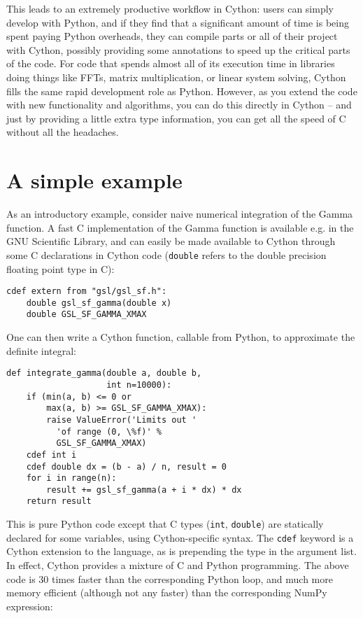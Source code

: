 \documentclass[letterpaper,11pt,english]{article}
\newcommand{\code}[1]{\texttt{#1}}
\begin{document}
This leads to an extremely productive workflow in Cython: users can
simply develop with Python, and if they find that a significant amount
of time is being spent paying Python overheads, they can compile parts
or all of their project with Cython, possibly providing some
annotations to speed up the critical parts of the code. For code that
spends almost all of its execution time in libraries doing things like
FFTs, matrix multiplication, or linear system solving, Cython fills
the same rapid development role as Python. However, as you extend the
code with new functionality and algorithms, you can do this directly
in Cython -- and just by providing a little extra type information,
you can get all the speed of C without all the headaches.


\section{A simple example}

As an introductory example, consider naive numerical integration of
the Gamma function.  A fast C implementation of the Gamma function is
available e.g. in the GNU Scientific Library, and can easily be made
available to Cython through some C declarations in Cython code
(\code{double} refers to the double precision floating point type in C):

\begin{verbatim}
cdef extern from "gsl/gsl_sf.h":
    double gsl_sf_gamma(double x)
    double GSL_SF_GAMMA_XMAX
\end{verbatim}

One can then write a Cython function, callable from Python, to
approximate the definite integral:

\begin{verbatim}
def integrate_gamma(double a, double b,
                    int n=10000):
    if (min(a, b) <= 0 or
        max(a, b) >= GSL_SF_GAMMA_XMAX):
        raise ValueError('Limits out '
          'of range (0, \%f)' %
          GSL_SF_GAMMA_XMAX)
    cdef int i
    cdef double dx = (b - a) / n, result = 0
    for i in range(n):
        result += gsl_sf_gamma(a + i * dx) * dx
    return result
\end{verbatim}

This is pure Python code except that C types (\code{int}, \code{double}) are
statically declared for some variables, using Cython-specific syntax.
The \code{cdef} keyword is a Cython extension to the language, as is
prepending the type in the argument list. In effect, Cython provides a
mixture of C and Python programming. The above code is 30 times faster
than the corresponding Python loop, and much more memory efficient
(although not any faster) than the corresponding NumPy expression:
\end{document}
